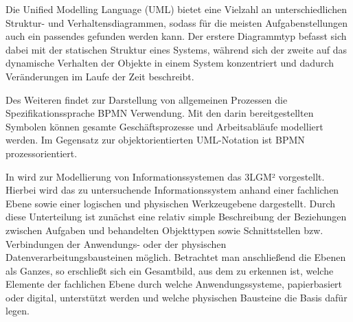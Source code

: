 Die Unified Modelling Language (UML) bietet eine Vielzahl an unterschiedlichen Struktur- und Verhaltensdiagrammen, sodass für die meisten Aufgabenstellungen auch ein passendes gefunden werden kann. Der erstere Diagrammtyp befasst sich dabei mit der statischen Struktur eines Systems, während sich der zweite auf das dynamische Verhalten der Objekte in einem System konzentriert und dadurch Veränderungen im Laufe der Zeit beschreibt. \citep{UML.2017}

Des Weiteren findet zur Darstellung von allgemeinen Prozessen die Spezifikationssprache BPMN Verwendung. Mit den darin bereitgestellten Symbolen können gesamte Geschäftsprozesse und Arbeitsabläufe modelliert werden. Im Gegensatz zur objektorientierten UML-Notation ist BPMN prozessorientiert. \citep{BPMN.2011}

In \citet{Winter.2023} wird zur Modellierung von Informationssystemen das \ac{3LGM²} vorgestellt. Hierbei wird das zu untersuchende Informationssystem anhand einer fachlichen Ebene sowie einer logischen und physischen Werkzeugebene dargestellt. Durch diese Unterteilung ist zunächst eine relativ simple Beschreibung der Beziehungen zwischen Aufgaben und behandelten Objekttypen sowie Schnittstellen bzw. Verbindungen der Anwendungs- oder der physischen Datenverarbeitungsbausteinen möglich. Betrachtet man anschließend die Ebenen als Ganzes, so erschließt sich ein Gesamtbild, aus dem zu erkennen ist, welche Elemente der fachlichen Ebene durch welche Anwendungssysteme, papierbasiert oder digital, unterstützt werden und welche physischen Bausteine die Basis dafür legen.